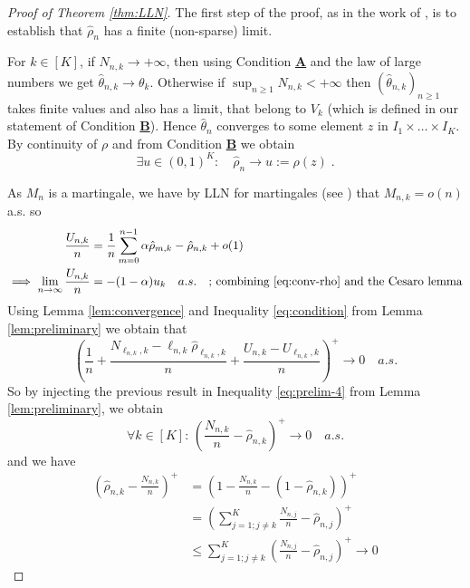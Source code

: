 \begin{proof}[Proof of Theorem \ref{thm:LLN}]	
The first step of the proof, as in the work of \cite{hu2004asymptotic}, is to establish that $\hat{\rho}_{n}$ has a finite (non-sparse) limit.
	
	For \(k \in [K]\), if \(N_{n,k} \to +\infty\), then using  Condition \hyperlink{CA}{\textbf{A}} and the law of large numbers %
	we get \(\hat\theta_{n,k} \to \theta_k\). Otherwise if \(\sup_{n \geq 1}N_{n,k} < +\infty\) then \(\left(\hat\theta_{n,k}\right)_{n \geq 1}\) takes finite values and also has a limit, that belong to $V_k$ (which is defined in our statement of Condition  \hyperlink{CB}{\textbf{B}}). Hence $\hat\theta_{n}$ converges to some element $z$ in $I_1\times \dots \times I_K$.  By continuity of $\rho$ and from Condition \hyperlink{CB}{\textbf{B}} we obtain
	\begin{equation}\label{eq:conv-rho}
		\exists u \in (0,1)^K: \quad \hat{\rho}_n \to u:= \rho(z)\;.
	\end{equation}
	
	As \(M_n\) is a martingale, we have by LLN for martingales (see \cite{Chow1967}) that $M_{n,k} = o(n)$ a.s. so
	\begin{align*}
		\frac{U_{n,k}}{n} &= \frac{1}{n} \sum_{m=0}^{n-1} \alpha \hat{\rho}_{m,k} - \hat{\rho}_{n,k} + o(1) \\
		\implies \lim_{n \to \infty} \frac{U_{n,k}}{n} &= - (1 - \alpha) u_k \quad a.s. \quad\text{; combining \eqref{eq:conv-rho} and the Cesaro lemma}
	\end{align*}
	Using Lemma \ref{lem:convergence} and Inequality \eqref{eq:condition} from Lemma \ref{lem:preliminary} we obtain that
	\[
	\left(\frac{1}{n}+\frac{N_{\ell_{n,k},k} - \ell_{n,k} \hat{\rho}_{\ell_{n,k},k}}{n} + \frac{U_{n,k} - U_{\ell_{n,k},k}}{n} \right)^+ \to 0 \quad a.s.
	\]
	So by injecting the previous result in Inequality \eqref{eq:prelim-4} from Lemma \ref{lem:preliminary}, we obtain
	\[
	\forall k \in [K]: \, \left(\frac{N_{n,k}}{n} - \hat{\rho}_{n,k}\right)^+ \to 0 \quad a.s.
	\]
	and we have
	\begin{align*}
		\left(\hat{\rho}_{n,k} - \frac{N_{n,k}}{n}\right)^+ &= \left(1 - \frac{N_{n,k}}{n} - (1 - \hat{\rho}_{n,k})\right)^+ \\
		&= \left(\sum_{j=1; j \neq k}^K \frac{N_{n,j}}{n} - \hat{\rho}_{n,j}\right)^+ \\
		&\leq \sum_{j=1; j \neq k}^K \left(\frac{N_{n,j}}{n} - \hat{\rho}_{n,j}\right)^+  \to 0
	\end{align*}
	

\end{proof}
